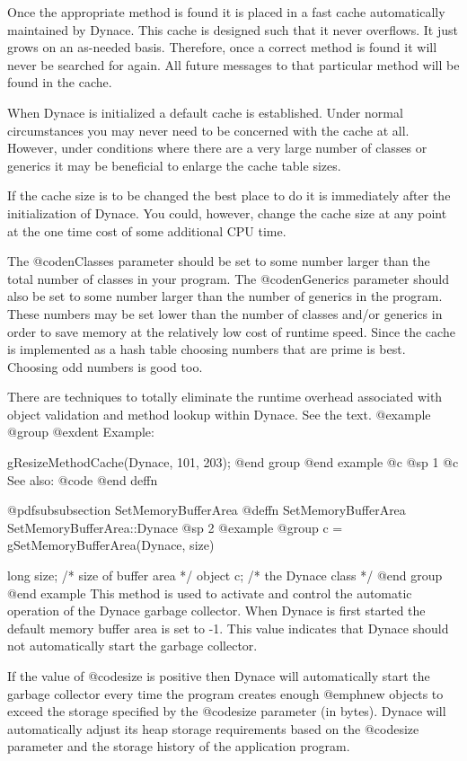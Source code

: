 Once the appropriate method is found it is placed in a fast cache
automatically maintained by Dynace.  This cache is designed such that
it never overflows.  It just grows on an as-needed basis.  Therefore,
once a correct method is found it will never be searched for again.
All future messages to that particular method will be found in the
cache.

When Dynace is initialized a default cache is established.  Under normal
circumstances you may never need to be concerned with the cache at
all.  However, under conditions where there are a very large number
of classes or generics it may be beneficial to enlarge the cache
table sizes.

If the cache size is to be changed the best place to do it is immediately
after the initialization of Dynace.  You could, however, change the cache size
at any point at the one time cost of some additional CPU time.

The @code{nClasses} parameter should be set to some number larger than
the total number of classes in your program.  The @code{nGenerics}
parameter should also be set to some number larger than the number of
generics in the program.  These numbers may be set lower than the
number of classes and/or generics in order to save memory at the
relatively low cost of runtime speed.  Since the cache is implemented
as a hash table choosing numbers that are prime is best.
Choosing odd numbers is good too.

There are techniques to totally eliminate the runtime overhead
associated with object validation and method lookup within Dynace.
See the text.
@example
@group
@exdent Example:

gResizeMethodCache(Dynace, 101, 203);
@end group
@end example
@c @sp 1
@c See also:  @code{}
@end deffn






@pdfsubsubsection {SetMemoryBufferArea}
@deffn {SetMemoryBufferArea} SetMemoryBufferArea::Dynace
@sp 2
@example
@group
c = gSetMemoryBufferArea(Dynace, size)

long    size;   /*  size of buffer area  */
object  c;      /*  the Dynace class  */
@end group
@end example
This method is used to activate and control the automatic operation of the
Dynace garbage collector.  When Dynace is first started the default memory buffer
area is set to -1.  This value indicates that Dynace should not automatically
start the garbage collector.

If the value of @code{size} is positive then Dynace will automatically
start the garbage collector every time the program creates enough
@emph{new} objects to exceed the storage specified by the @code{size}
parameter (in bytes).  Dynace will automatically adjust its heap storage
requirements based on the @code{size} parameter and the storage history
of the application program.


